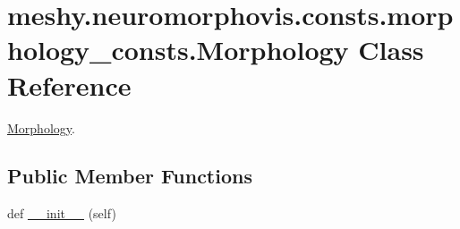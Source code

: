 \hypertarget{classmeshy_1_1neuromorphovis_1_1consts_1_1morphology__consts_1_1Morphology}{}\section{meshy.\+neuromorphovis.\+consts.\+morphology\+\_\+consts.\+Morphology Class Reference}
\label{classmeshy_1_1neuromorphovis_1_1consts_1_1morphology__consts_1_1Morphology}


\hyperlink{classmeshy_1_1neuromorphovis_1_1consts_1_1morphology__consts_1_1Morphology}{Morphology}.  


\subsection*{Public Member Functions}
\begin{DoxyCompactItemize}
\item 
def \hyperlink{classmeshy_1_1neuromorphovis_1_1consts_1_1morphology__consts_1_1Morphology_ac34aa61ff8210aece2b4f4d13e131b4d}{\+\_\+\+\_\+init\+\_\+\+\_\+} (self)\hypertarget{classmeshy_1_1neuromorphovis_1_1consts_1_1morphology__consts_1_1Morphology_ac34aa61ff8210aece2b4f4d13e131b4d}{}\label{classmeshy_1_1neuromorphovis_1_1consts_1_1morphology__consts_1_1Morphology_ac34aa61ff8210aece2b4f4d13e131b4d}

\end{DoxyCompactItemize}
